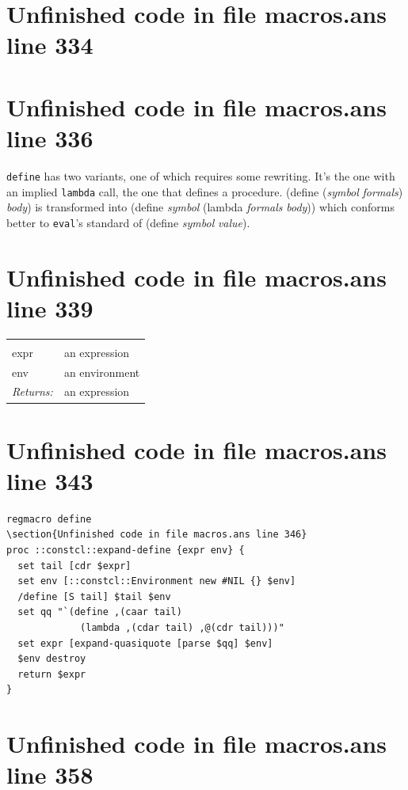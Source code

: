 \documentclass[twoside,9pt]{report}
\begin{document}
\section{Unfinished code in file macros.ans line 334}
\section{Unfinished code in file macros.ans line 336}

\texttt{define} has two variants, one of which requires some rewriting. It's the one with an implied \texttt{lambda} call, the one that defines a procedure. (define (\emph{symbol} \emph{formals}) \emph{body}) is transformed into (define \emph{symbol} (lambda \emph{formals} \emph{body})) which conforms better to \texttt{eval}'s standard of (define \emph{symbol} \emph{value}).

\section{Unfinished code in file macros.ans line 339}
\noindent\begin{tabular}{ |p{1.9cm} p{8cm}| }
\hline
\rowcolor[HTML]{CCCCCC} \multicolumn{2}{|l|}{\bf expand-define (internal)} \\
expr & an expression \\
env & an environment \\
\textit{Returns:} & an expression \\
\hline
\end{tabular}
\section{Unfinished code in file macros.ans line 343}
\begin{lstlisting}
regmacro define
\section{Unfinished code in file macros.ans line 346}
proc ::constcl::expand-define {expr env} {
  set tail [cdr $expr]
  set env [::constcl::Environment new #NIL {} $env]
  /define [S tail] $tail $env
  set qq "`(define ,(caar tail)
             (lambda ,(cdar tail) ,@(cdr tail)))"
  set expr [expand-quasiquote [parse $qq] $env]
  $env destroy
  return $expr
}
\end{lstlisting}
\section{Unfinished code in file macros.ans line 358}
\end{document}
